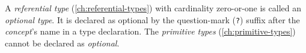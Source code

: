 A \emph{referential type} (\ref{ch:referential-types})
with cardinality zero-or-one is called an \emph{optional type}.
It is declared as optional by the question-mark (\verb|?|) suffix
after the \emph{concept}'s name in a type declaration.
The \emph{primitive types} (\ref{ch:primitive-types})
cannot be declared as \emph{optional}.
